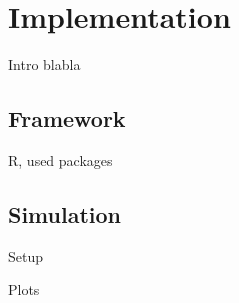 \section{Implementation}

Intro blabla

\subsection{Framework}

R, used packages

\subsection{Simulation}

Setup

Plots